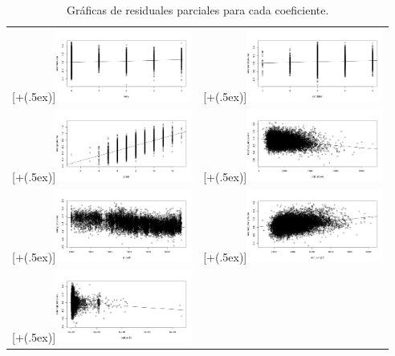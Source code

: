 \documentclass[10pt,letterpaper]{article}
\newcommand*{\addheight}[2][.5ex]{%
	\raisebox{0pt}[\dimexpr\height+(#1)\relax]{#2}%
}
\begin{document}
\begin{table}
\begin{tabular}{cc}
		\addheight{\includegraphics[width=45mm]{pr7.png}} &
		\addheight{\includegraphics[width=45mm]{pr8.png}} \\
		\addheight{\includegraphics[width=45mm]{pr9.png}} &
		\addheight{\includegraphics[width=45mm]{pr10.png}} \\
		\addheight{\includegraphics[width=45mm]{pr11.png}} &
		\addheight{\includegraphics[width=45mm]{pr12.png}} \\
		\addheight{\includegraphics[width=45mm]{pr13.png}} & \\
	\end{tabular}
	\caption{Gráficas de residuales parciales para cada coeficiente.} 
	\label{tab:estr}
\end{table}
\end{document}
